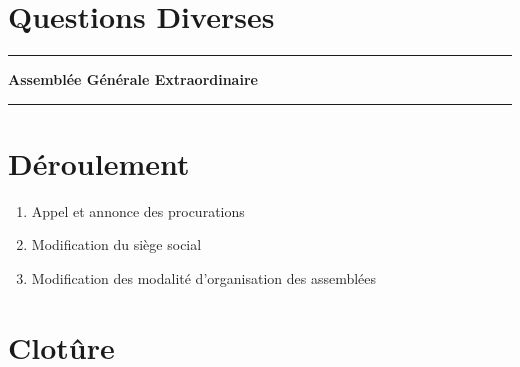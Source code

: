 \documentclass[11pt]{article}
\begin{document}



\section{Questions Diverses}

\newpage

\hrule
\vspace{.3cm}
\begin{center}
\Large\bfseries Assemblée Générale Extraordinaire
\end{center}
\vspace{.3cm}
\hrule

\vspace{1.5cm}

\section*{Déroulement}

\begin{enumerate}
    \item Appel et annonce des procurations
    \item Modification du siège social
	\item Modification des modalité d’organisation des assemblées
\end{enumerate}

\setcounter{section}{1}
\section*{Clotûre}
\end{document}
